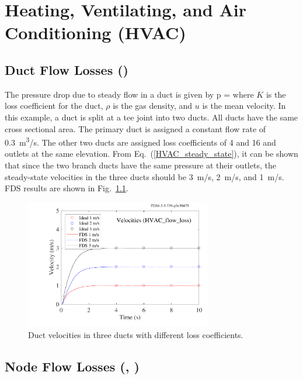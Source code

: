 \documentclass[11pt]{book}
\begin{document}
\chapter{Heating, Ventilating, and Air Conditioning (HVAC)}

\section{Duct Flow Losses (\texorpdfstring{}{HVAC\_flow\_loss})}
\label{HVAC_flow_loss}

The pressure drop due to steady flow in a duct is given by
\be
\Delta p =   \label {HVAC_steady_state}
\ee
where $K$ is the loss coefficient for the duct, $\rho$ is the gas density, and $u$ is the mean velocity. In this example, a duct is split at a tee joint into two ducts. All ducts have the same cross sectional area.  The primary duct is assigned a constant flow rate of 0.3~\si{m^3/s}.  The other two ducts are assigned loss coefficients of 4 and 16 and outlets at the same elevation.  From Eq.~(\ref{HVAC_steady_state}), it can be shown that since the two branch ducts have the same pressure at their outlets, the steady-state velocities in the three ducts should be 3~m/s, 2~m/s, and 1~m/s.  FDS results are shown in Fig.~\ref{fig_HVAC_loss}.

\begin{figure}[ht]
\centering
\includegraphics[width=3.2in]{SCRIPT_FIGURES/HVAC_flow_loss}
\caption[The  test case]{Duct velocities in three ducts with different loss coefficients.}
\label{fig_HVAC_loss}
\end{figure}

\clearpage

\section{Node Flow Losses (\texorpdfstring{}{HVAC\_tee\_loss\_1}, \texorpdfstring{}{HVAC\_tee\_loss\_2})}
\label{HVAC_tee_loss_1}
\label{HVAC_tee_loss_2}
\end{document}
